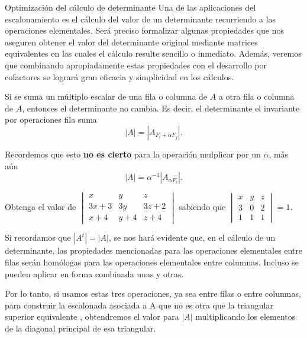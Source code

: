 \begin{subsection}{Optimizaci\'on del c\'alculo de determinante}
Una de las aplicaciones del escalonamiento es el cálculo del valor de un determinante recurriendo a las operaciones elementales.  Será preciso formalizar algunas propiedades que nos aseguren obtener el valor del determinante original mediante matrices equivalentes en las cuales el cálculo resulte sencillo o inmediato. Además, veremos que combinando apropiadamente estas propiedades con el desarrollo por cofactores se logrará gran eficacia y simplicidad en los cálculos.

\begin{thm}
Si se suma un múltiplo escalar de una fila o columna de $A$ a otra fila o columna de $A$, entonces el determinante no cambia. Es decir, el determinante el invariante por operaciones fila suma
\[|A|=|A_{F_i+\alpha F_j}|.\]
\end{thm}
Recordemos que esto \textbf{no es cierto} para la operaci\'on mulplicar por un $\alpha$, m\'as a\'un
\[|A|=\alpha^{-1}|A_{\alpha F_i}|.\]

\begin{ejer}
Obtenga el valor de $ \begin{vmatrix} x & y & z \\ 3x+3 & 3y & 3z+2 \\ x+4 & y+4 & z+4 \end{vmatrix}$ sabiendo que $ \begin{vmatrix} x & y & z \\ 3 & 0 & 2 \\ 1 & 1 & 1 \end{vmatrix}=1$.
    \vspace*{0.5cm}
\end{ejer}
Si recordamos que $|A^t| = |A|$, se nos hará evidente que, en el cálculo de un determinante, las propiedades mencionadas para las operaciones elementales entre filas serán homólogas para las operaciones elementales entre columnas. Incluso se pueden aplicar en forma combinada unas y otras.

Por lo tanto, si usamos estas tres operaciones, ya sea entre filas o entre columnas, para construir la escalonada asociada a A  que no es otra que la triangular superior equivalente , obtendremos el valor para $|A|$ multiplicando los elementos de la diagonal principal de esa triangular.



\end{subsection}
